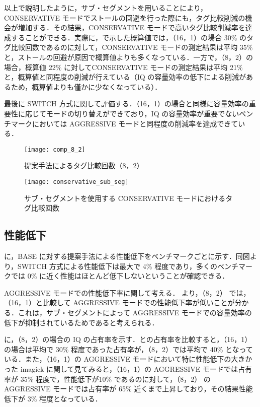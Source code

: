 以上で説明したように，サブ・セグメントを用いることにより，CONSERVATIVE モードでストールの回避を行った際にも，タグ比較削減の機会が増加する．その結果，CONSERVATIVE モードで高いタグ比較削減率を達成することができる．実際に，で示した概算値では，（16，1）の場合 30\% のタグ比較回数であるのに対して，CONSERVATIVE モードの測定結果は平均 35\% と，ストールの回避が原因で概算値よりも多くなっている．一方で，（8，2）の場合，概算値 22\% に対してCONSERVATIVE モードの測定結果は平均 21\% と，概算値と同程度の削減が行えている（IQ の容量効率の低下による削減があるため，概算値よりも僅かに少なくなっている）．

最後に SWITCH 方式に関して評価する．（16，1）の場合と同様に容量効率の重要性に応じてモードの切り替えができており，IQ の容量効率が重要でないベンチマークにおいては AGGRESSIVE モードと同程度の削減率を達成できている．

\begin{figure}[htb]
  \centering
  \texttt{[image: comp\_8\_2]}
  \caption{提案手法によるタグ比較回数（8，2）}
  \label{fig:comp_8_2}
\end{figure}

\begin{figure}[htb]
  \centering
  \texttt{[image: conservative\_sub\_seg]}
  \caption{サブ・セグメントを使用する CONSERVATIVE モードにおけるタグ比較回数}
  \label{fig:conservative_sub_seg}
\end{figure}

\clearpage

\subsection{性能低下}
に，BASE に対する提案手法による性能低下をベンチマークごとに示す．同図より，SWITCH 方式による性能低下は最大で 4\% 程度であり，多くのベンチマークでは 0\% に近く性能はほとんど低下しないということが確認できる．

AGGRESSIVE モードでの性能低下率に関して考える． より，（8，2） では，（16，1）と比較して AGGRESSIVE モードでの性能低下率が低いことが分かる．これは，サブ・セグメントによって AGGRESSIVE モードでの容量効率の低下が抑制されているためであると考えられる．

 に，（8，2）の場合の IQ の占有率を示す．との占有率を比較すると，（16，1）の場合は平均で 30\% 程度であった占有率が，（8，2）では平均で 40\% となっている．また，（16，1）の AGGRESSIVE モードにおいて特に性能低下の大きかった imagick に関して見てみると，（16，1）の AGGRESSIVE モードでは占有率が 35\% 程度で，性能低下が10\% であるのに対して，（8，2） の AGGRESSIVE モードでは占有率が 65\% 近くまで上昇しており，その結果性能低下が 3\% 程度となっている．

